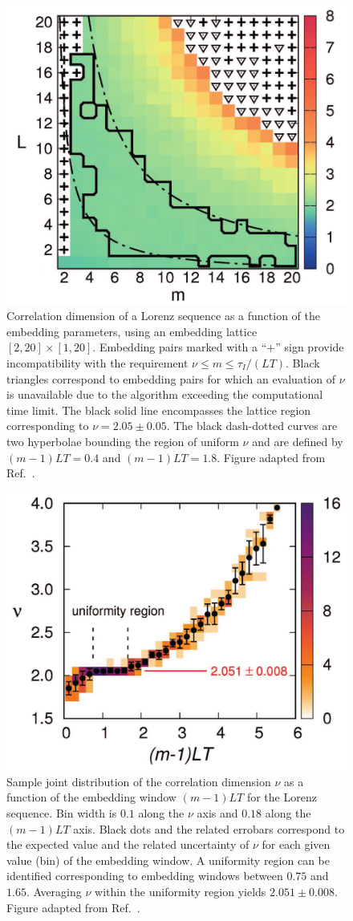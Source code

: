 \begin{figure}[!htbp]
\centering
\includegraphics[width=.6\linewidth]{images/heatmap_Lorenz.png}
\caption{Correlation dimension of a Lorenz sequence as a function of the embedding parameters, using an embedding lattice
$[2, 20]\times[1, 20]$. Embedding pairs marked with a ``$+$'' sign provide incompatibility with the
requirement $\nu \leq m \leq \tau_I/(LT)$. Black triangles correspond to embedding pairs for which
an evaluation of $\nu$ is unavailable due to the algorithm exceeding the computational time limit.
The black solid line encompasses the lattice region corresponding to $\nu=2.05\pm0.05$.
The black dash-dotted curves are two hyperbolae bounding the region of uniform $\nu$ and
are defined by $(m-1)LT=0.4$ and $(m-1)LT=1.8$.
Figure adapted from Ref.~\cite{ref:perinelli2020chasing}.
}\label{fig: Lorenz heatmap}
\end{figure}

\begin{figure}[!htbp]
    \centering
    \includegraphics[width=.6\linewidth]{images/joint_Lorenz.png}
    \caption{Sample joint distribution of the correlation dimension $\nu$ as a function of the
    embedding window $(m-1)LT$ for the Lorenz sequence. Bin width is $0.1$ along the $\nu$ axis and
    $0.18$ along the $(m-1)LT$ axis.
    Black dots and the related errobars correspond to the expected value and the related uncertainty of
    $\nu$ for each given value (bin) of the embedding window. A uniformity region can be identified
    corresponding to embedding windows between $0.75$ and $1.65$. Averaging $\nu$ within
    the uniformity region yields $2.051 \pm 0.008$.
    Figure adapted from Ref.~\cite{ref:perinelli2020chasing}.
    }\label{fig: Lorenz joint}
\end{figure}

